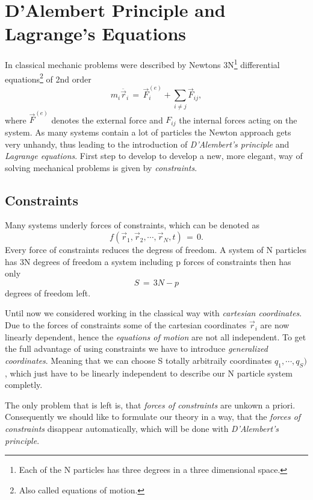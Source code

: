 \chapter{D'Alembert Principle and Lagrange's Equations}
In classical mechanic problems were described by Newtons 3N\footnote{Each of
the N particles has three degrees in a three dimensional space.} differential
equations\footnote{Also called equations of motion.} of 2nd order 
\begin{equation}
  m_i \ddot{\vec r_i} \,=\, \vec F_i^{(e)} + \sum_{i \neq j} \vec F_{ij},
\end{equation}
where $\vec F^{(e)}$ denotes the external force and $F_{ij}$ the internal forces
acting on the system. As many systems contain a lot of particles the Newton
approach gets very unhandy, thus leading to the introduction of \textit{D'Alembert's
principle} and \textit{Lagrange equations}. First step to develop to develop a
new, more elegant, way of solving mechanical problems is given by
\textit{constraints}.

\section{Constraints}
Many systems underly forces of constraints, which can be denoted as 
\begin{equation}
  \label{holonomicConstraint}
  f(\vec r_1, \vec r_2, \cdots, \vec r_N, t) \,=\, 0.
\end{equation}
Every force of constraints reduces the degress of freedom. A system of N
particles has 3N degrees of freedom a system including p forces of
constraints then has only
\begin{equation}
  S \,=\, 3N - p
\end{equation}
degrees of freedom left. 

Until now we considered working in the classical way with \textit{cartesian
coordinates}. Due to the forces of constraints some of the cartesian coordinates $\vec
r_i$ are now linearly dependent, hence the \textit{equations of motion} are not
all independent. To get the full advantage of using constraints we have to
introduce \textit{generalized coordinates}. Meaning that we can choose S
totally arbitraily coordinates $q_1, \cdots, q_S)$, which just have to be linearly
independent to describe our N particle system completly. 

The only problem that is left is, that \textit{forces of constraints} are
unkown a priori. Consequently we should like to formulate our theory in a way,
that the \textit{forces of constraints} disappear automatically, which will be 
done with \textit{D'Alembert's principle}. 


